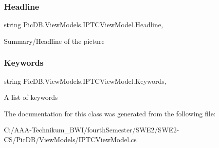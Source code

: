 \subsubsection{\texorpdfstring{Headline}{Headline}}
{\footnotesize\ttfamily string Pic\+D\+B.\+View\+Models.\+I\+P\+T\+C\+View\+Model.\+Headline\hspace{0.3cm}{\ttfamily [get]}, {\ttfamily [set]}}



Summary/\+Headline of the picture 

\mbox{\label{class_pic_d_b_1_1_view_models_1_1_i_p_t_c_view_model_a0358809f08dae5ca402fbd91f62eeef5}} 
\subsubsection{\texorpdfstring{Keywords}{Keywords}}
{\footnotesize\ttfamily string Pic\+D\+B.\+View\+Models.\+I\+P\+T\+C\+View\+Model.\+Keywords\hspace{0.3cm}{\ttfamily [get]}, {\ttfamily [set]}}



A list of keywords 



The documentation for this class was generated from the following file\+:\begin{DoxyCompactItemize}
\item 
C\+:/\+A\+A\+A-\/\+Technikum\+\_\+\+B\+W\+I/fourth\+Semester/\+S\+W\+E2/\+S\+W\+E2-\/\+C\+S/\+Pic\+D\+B/\+View\+Models/I\+P\+T\+C\+View\+Model.\+cs\end{DoxyCompactItemize}
